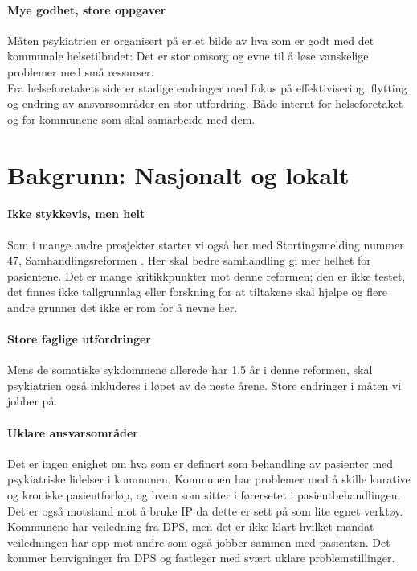 \documentclass[11pt]{report} %
\begin{document}
                  \paragraph{Mye godhet, store oppgaver\\}
                    Måten psykiatrien er organisert på er et bilde av hva som er godt med det kommunale helsetilbudet: Det er stor omsorg og evne til å løse vanskelige problemer med små ressurser\label{stor_vilje_til_hjelp}.\\
                    Fra helseforetakets side er stadige endringer med fokus på effektivisering, flytting og endring av ansvarsområder en stor utfordring. Både internt for helseforetaket og for kommunene som skal samarbeide med dem.\\

                \section{Bakgrunn: Nasjonalt og lokalt}\label{sec:ov_bakg}
                  \paragraph{Ikke stykkevis, men helt\\}
                    Som i mange andre prosjekter starter vi også her med Stortingsmelding nummer 47, Samhandlingsreformen
                    \cite{Stmld47}. Her skal bedre samhandling gi mer helhet for pasientene. Det er mange kritikkpunkter mot denne reformen; den er ikke testet, det finnes ikke tallgrunnlag eller forskning for at tiltakene skal hjelpe og flere andre grunner det ikke er rom for å nevne her.
                  \paragraph{Store faglige utfordringer\\}
                    Mens de somatiske sykdommene allerede har 1,5 år i denne reformen, skal psykiatrien også inkluderes i løpet av de neste årene. Store endringer i måten vi jobber på.
                  \paragraph{Uklare ansvarsområder\\}  
                    Det er ingen enighet om hva som er definert som behandling av pasienter med psykiatriske lidelser i kommunen. Kommunen har problemer med å skille kurative og kroniske pasientforløp, og hvem som sitter i førersetet i pasientbehandlingen. Det er også motstand mot å bruke IP da dette er sett på som lite egnet verktøy. Kommunene har veiledning fra DPS, men det er ikke klart hvilket mandat veiledningen har opp mot andre som også jobber sammen med pasienten. Det kommer henvigninger fra DPS og fastleger med svært uklare problemstillinger. 
\end{document}
